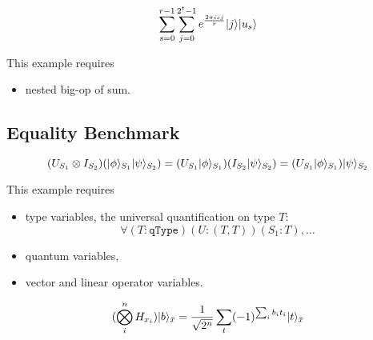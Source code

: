 \begin{example}
  $$
  \sum_{s=0}^{r-1} \sum_{j=0}^{2^t-1} e^{\frac{2\pi i s j}{r}} |j\rangle |u_s\rangle
  $$
\end{example}
This example requires
\begin{itemize}
  \item nested big-op of sum.
\end{itemize}


\subsection{Equality Benchmark}

\begin{example}
  $$
  (U_{S_1} \otimes I_{S_2}) (|\phi\rangle_{S_1} |\psi\rangle_{S_2}) = (U_{S_1} |\phi\rangle_{S_1}) (I_{S_2}|\psi\rangle_{S_2}) = (U_{S_1} |\phi\rangle_{S_1}) |\psi\rangle_{S_2}
  $$
\end{example}
This example requires 
\begin{itemize}
  \item type variables, the universal quantification on type $T$:
    $$
    \forall (T : \texttt{qType}) (U : (T, T)) (S_1 : T), \dots
    $$
  \item quantum variables,
  \item vector and linear operator variables.
\end{itemize}

\begin{example} [ParaHadamard]
  $$
  (\bigotimes_i^n H_{x_i}) |b\rangle_{\bar{x}} = \frac{1}{\sqrt{2^n}} \sum_t (-1)^{\sum_i b_i t_i} |t\rangle_{\bar{x}}
  $$
\end{example}










